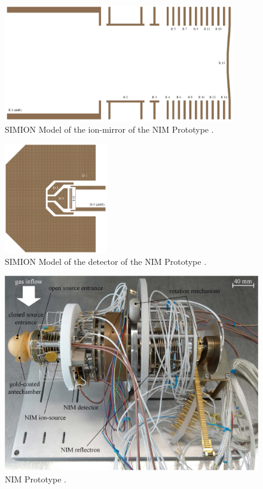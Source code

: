 		\begin{figure}[h]
			\centering
			\includegraphics[width=0.9\textwidth]{Setup/Prototype_Reflectron_sim.jpg}
			\caption{SIMION Model of the ion-mirror of the NIM Prototype \cite{Diss_Meyer}.}
			\label{fig:SetupProtoReflSim}
		\end{figure}
		
		\begin{figure}[h]
			\centering
			\includegraphics[width=0.4\textwidth]{Setup/Prototype_Detector_sim.jpg}
			\caption{SIMION Model of the detector of the NIM Prototype \cite{Diss_Meyer}.}
			\label{fig:SetupDetSim}
		\end{figure}
		
		\begin{figure}[h] %
			\centering
			\includegraphics[width=\textwidth]{Setup/Prototype_totPic.jpg}
			\caption{NIM Prototype \cite{Diss_Meyer}.}
			\label{fig:SetupProto}
		\end{figure}
		
